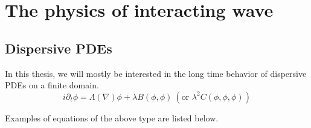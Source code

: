 \section{The physics of interacting wave}

\subsection{Dispersive PDEs}\label{sec.dispintro}
In this thesis, we will mostly be interested in the long time behavior of dispersive PDEs on a finite domain.
\begin{equation}
    i\partial_t \phi = \Lambda(\nabla) \phi + \lambda B(\phi,\phi)\ (\text{or } \lambda^2 C(\phi,\phi,\phi))
\end{equation}

Examples of equations of the above type are listed below.
